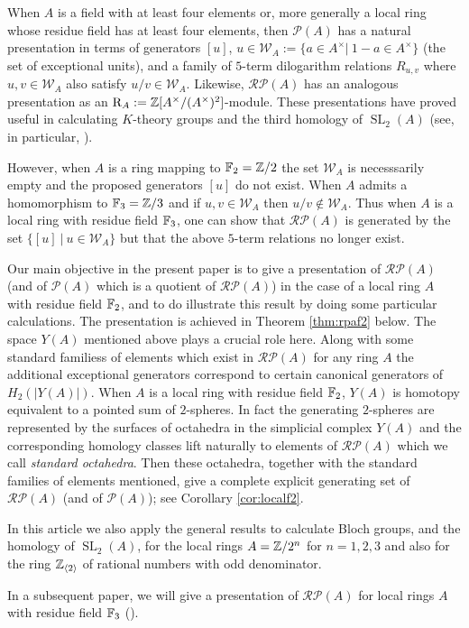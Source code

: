 \documentclass[12pt]{amsart}
\theoremstyle{definition}
\newcommand{\F}[1]{\Bbb{F}_{#1}}
\newcommand{\Z}{\Bbb{Z}}
\newcommand{\wn}[1]{\mathcal{W}_{#1}}%
\newcommand{\spl}[2]{\operatorname{SL}_{#1}\left(#2\right)}
\newcommand{\pb}[1]{\mathcal{P}(#1)}%
\newcommand{\rpb}[1]{\mathcal{RP}(#1)}%
\newcommand{\gpb}[1]{\left[ #1\right]} %
\newcommand{\<}{\langle}
\renewcommand{\>}{\rangle}
\newcommand{\sgr}[1]{\mathrm{R}_{#1}}%
\newcommand{\an}[1]{\left\langle{#1}\right\rangle}
\begin{document}
When $A$ is a field with at  least four elements or, more generally a local ring whose residue field has at least four elements, then $\pb{A}$ has a natural presentation in terms of generators $\gpb{u}$, $u\in \wn{A}:=\{ a\in A^\times|\  1-a\in A^\times\}$ (the set of exceptional units), and a family of $5$-term dilogarithm relations  $R_{u,v}$ where $u,v\in\wn{A}$ also satisfy $u/v\in \wn{A}$. Likewise, $\rpb{A}$ has an analogous presentation as an $\sgr{A}:=\Z[A^\times/(A^\times)^2]$-module. These presentations have proved useful in calculating $K$-theory groups and the third homology of $\spl{2}{A}$ (see, in particular, \cite{hut:sl2Q}).

 However, when $A$ is a ring mapping to $\F{2}=\Z/2$ the set $\wn{A}$ is necesssarily empty and the proposed generators $\gpb{u}$ do not exist. When $A$ admits a homomorphism to $\F{3}=\Z/3$ and if $u,v\in\wn{A}$ then $u/v\not\in \wn{A}$. Thus when $A$ is a local ring with residue field $\F{3}$, one can show that $\rpb{A}$ is generated  by the set $\{ \gpb{u}\ |\ u\in\wn{A}\}$ but that the above $5$-term relations no longer exist.

Our main objective in the present paper is to give a presentation of $\rpb{A}$ (and of $\pb{A}$ which is a quotient of $\rpb{A}$) in the case of a local ring $A$ with residue field $\F{2}$, and to do illustrate this result by doing some particular calculations. The presentation is achieved  in Theorem \ref{thm:rpaf2} below. The space $Y(A)$ mentioned above plays a crucial role here. Along with some standard familiess of elements which exist  in $\rpb{A}$ for any ring $A$ the additional exceptional generators correspond to certain canonical generators of $H_2(|Y(A)|)$. When $A$ is a local ring with residue field $\F{2}$, $Y(A)$ is homotopy equivalent to a pointed sum of $2$-spheres. In fact the generating $2$-spheres are represented by the surfaces of octahedra in the simplicial complex $Y(A)$ and the corresponding homology classes lift naturally to elements of $\rpb{A}$ which we call \emph{standard octahedra}. Then these octahedra, together with the standard families of elements mentioned, give a complete explicit generating set of $\rpb{A}$ (and of $\pb{A}$); see Corollary \ref{cor:localf2}.

In this article we also apply the general results to calculate Bloch groups, and the homology of $\spl{2}{A}$, for the local rings $A=\Z/2^n$ for $n=1,2,3$ and also for the ring $\Z_{\an{2}}$ of rational numbers with odd denominator.

In a subsequent paper, we will give a presentation of $\rpb{A}$ for local rings $A$ with residue field $\F{3}$  (\cite{hut:blochf3}).
\end{document}
